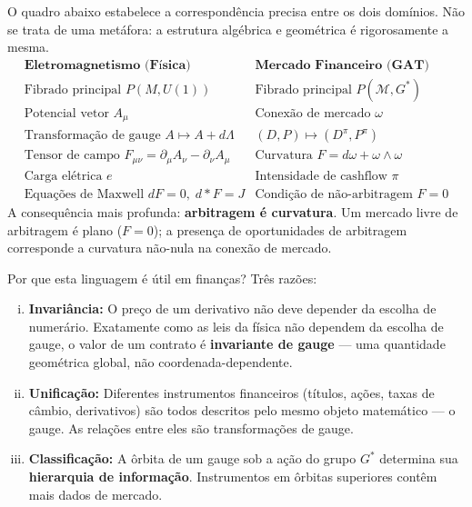 \begin{obs}
O quadro abaixo estabelece a correspond\^encia precisa entre os dois
dom\'inios. N\~ao se trata de uma met\'afora: a estrutura alg\'ebrica e
geom\'etrica \'e rigorosamente a mesma.
\[
\begin{array}{c|c}
\textbf{Eletromagnetismo (F\'isica)} & \textbf{Mercado Financeiro (GAT)} \\ \hline
\text{Fibrado principal } P(M, U(1)) & \text{Fibrado principal } P(\mathcal{M}, G^*) \\
\text{Potencial vetor } A_\mu & \text{Conex\~ao de mercado } \omega \\
\text{Transforma\c{c}\~ao de gauge } A \mapsto A + d\Lambda & (D,P) \mapsto (D^\pi, P^\pi) \\
\text{Tensor de campo } F_{\mu\nu} = \partial_\mu A_\nu - \partial_\nu A_\mu & \text{Curvatura } F = d\omega + \omega \wedge \omega \\
\text{Carga el\'etrica } e & \text{Intensidade de cashflow } \pi \\
\text{Equa\c{c}\~oes de Maxwell } dF = 0,\; d*F = J & \text{Condi\c{c}\~ao de n\~ao-arbitragem } F = 0
\end{array}
\]
A consequ\^encia mais profunda: \textbf{arbitragem \'e curvatura}. Um
mercado livre de arbitragem \'e plano ($F = 0$); a presen\c{c}a de
oportunidades de arbitragem corresponde a curvatura n\~ao-nula na
conex\~ao de mercado.
\end{obs}

Por que esta linguagem \'e \'util em finan\c{c}as? Tr\^es raz\~oes:

\begin{enumerate}[(i)]
 \item \textbf{Invari\^ancia:} O pre\c{c}o de um derivativo n\~ao deve
 depender da escolha de numer\'ario. Exatamente como as leis da
 f\'isica n\~ao dependem da escolha de gauge, o valor de um
 contrato \'e \textbf{invariante de gauge} --- uma quantidade
 geom\'etrica global, n\~ao coordenada-dependente.
 \item \textbf{Unifica\c{c}\~ao:} Diferentes instrumentos financeiros
 (t\'itulos, a\c{c}\~oes, taxas de c\^ambio, derivativos) s\~ao
 todos descritos pelo mesmo objeto matem\'atico --- o gauge. As
 rela\c{c}\~oes entre eles s\~ao transforma\c{c}\~oes de gauge.
 \item \textbf{Classifica\c{c}\~ao:} A \^orbita de um gauge sob a
 a\c{c}\~ao do grupo $G^*$ determina sua \textbf{hierarquia de
 informa\c{c}\~ao}. Instrumentos em \^orbitas superiores
 cont\^em mais dados de mercado.
\end{enumerate}

